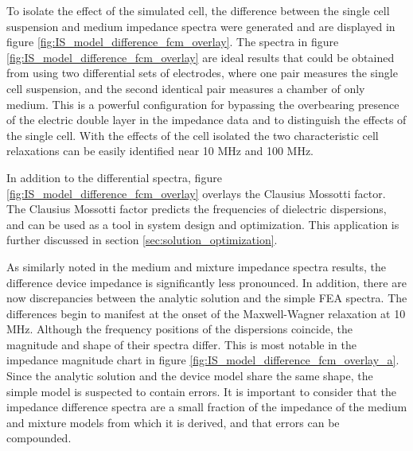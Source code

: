 \par To isolate the effect of the simulated cell, the difference between the single cell suspension and medium impedance spectra were generated and are displayed in figure \ref{fig:IS_model_difference_fcm_overlay}. The spectra in figure \ref{fig:IS_model_difference_fcm_overlay} are ideal results that could be obtained from using two differential sets of electrodes, where one pair measures the single cell suspension, and the second identical pair measures a chamber of only medium. This is a powerful configuration for bypassing the overbearing presence of the electric double layer in the impedance data and to distinguish the effects of the single cell. With the effects of the cell isolated the two characteristic cell relaxations can be easily identified near 10 MHz and 100 MHz.

\par In addition to the differential spectra, figure \ref{fig:IS_model_difference_fcm_overlay} overlays the Clausius Mossotti factor. The Clausius Mossotti factor predicts the frequencies of dielectric dispersions, and can be used as a tool in system design and optimization. This application is further discussed in section \ref{sec:solution_optimization}.

\par As similarly noted in the medium and mixture impedance spectra results, the difference device impedance is significantly less pronounced. In addition, there are now discrepancies between the analytic solution and the simple FEA spectra. The differences begin to manifest at the onset of the Maxwell-Wagner relaxation at 10 MHz. Although the frequency positions of the dispersions coincide, the magnitude and shape of their spectra differ. This is most notable in the impedance magnitude chart in figure \ref{fig:IS_model_difference_fcm_overlay_a}. Since the analytic solution and the device model share the same shape, the simple model is suspected to contain errors. It is important to consider that the impedance difference spectra are a small fraction of the impedance of the medium and mixture models from which it is derived, and that errors can be compounded.


